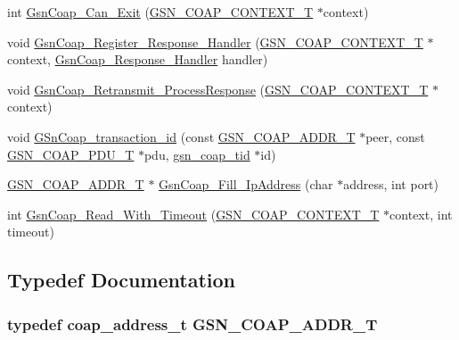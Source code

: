 \begin{DoxyCompactItemize}
int \hyperlink{a00479_a7faa0494ebe3e18e64b996b6d98ffa1f}{GsnCoap\_\-Can\_\-Exit} (\hyperlink{a00479_ab529666f5a53e57a0760df584886eb5b}{GSN\_\-COAP\_\-CONTEXT\_\-T} $\ast$context)
\item 
void \hyperlink{a00479_a9864cd63d09c74e0628a62dbbfe942c8}{GsnCoap\_\-Register\_\-Response\_\-Handler} (\hyperlink{a00479_ab529666f5a53e57a0760df584886eb5b}{GSN\_\-COAP\_\-CONTEXT\_\-T} $\ast$context, \hyperlink{a00479_ab7f36da79cbe8ef013039d64a86a29ae}{GsnCoap\_\-Response\_\-Handler} handler)
\item 
void \hyperlink{a00479_acab092ce28c8e8bcf6c0589b088e8a54}{GsnCoap\_\-Retransmit\_\-ProcessResponse} (\hyperlink{a00479_ab529666f5a53e57a0760df584886eb5b}{GSN\_\-COAP\_\-CONTEXT\_\-T} $\ast$context)
\item 
void \hyperlink{a00479_aa827f547f0fb4491a962d03f4726a6be}{GSnCoap\_\-transaction\_\-id} (const \hyperlink{a00479_a5fe762c7fbc5387bb76de5d8adfc1bc4}{GSN\_\-COAP\_\-ADDR\_\-T} $\ast$peer, const \hyperlink{a00538_afde87a99bfaad4a8beac3df27a309976}{GSN\_\-COAP\_\-PDU\_\-T} $\ast$pdu, \hyperlink{a00479_adc7d7e60daa14476026edb6edc26b0d6}{gsn\_\-coap\_\-tid} $\ast$id)
\item 
\hyperlink{a00479_a5fe762c7fbc5387bb76de5d8adfc1bc4}{GSN\_\-COAP\_\-ADDR\_\-T} $\ast$ \hyperlink{a00479_a9fed8142f75934e3d2a3f350fb71bc75}{GsnCoap\_\-Fill\_\-IpAddress} (char $\ast$address, int port)
\item 
int \hyperlink{a00479_a87e33c083c77555cbe5458cf7f7711a6}{GsnCoap\_\-Read\_\-With\_\-Timeout} (\hyperlink{a00479_ab529666f5a53e57a0760df584886eb5b}{GSN\_\-COAP\_\-CONTEXT\_\-T} $\ast$context, int timeout)
\end{DoxyCompactItemize}


\subsection{Typedef Documentation}
\hypertarget{a00479_a5fe762c7fbc5387bb76de5d8adfc1bc4}{
\subsubsection[{GSN\_\-COAP\_\-ADDR\_\-T}]{\setlength{\rightskip}{0pt plus 5cm}typedef coap\_\-address\_\-t {\bf GSN\_\-COAP\_\-ADDR\_\-T}}}
\label{a00479_a5fe762c7fbc5387bb76de5d8adfc1bc4}


